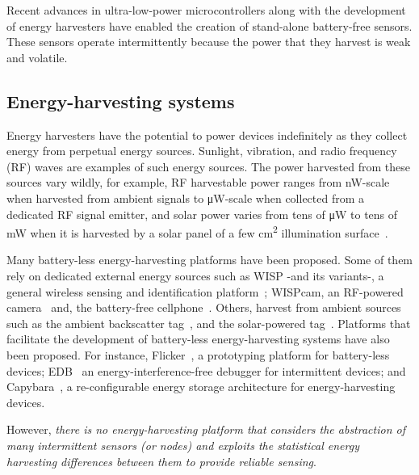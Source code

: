 Recent advances in ultra-low-power microcontrollers along with the development of energy harvesters have enabled the creation of stand-alone battery-free sensors. These sensors operate intermittently because the power that they harvest is
weak and volatile.

\subsection{Energy-harvesting systems}
Energy harvesters have the potential to power devices indefinitely as they collect energy from perpetual energy sources. Sunlight, vibration, and radio frequency (RF) waves are examples of such energy sources. The power harvested from these sources vary wildly, for example, RF harvestable power ranges from
\si{\nano\watt}-scale when harvested from ambient signals to \si{\uW}-scale when collected from a dedicated RF signal emitter, and solar power varies from tens of \si{\uW} to tens of \si{\mW} when it is harvested by a solar panel of a few \si{\cm^2} illumination surface~\cite{lucia2017intermittent,rao2017ambient}.

Many battery-less energy-harvesting platforms have been proposed. Some of them
rely on dedicated external energy sources such as WISP -and its variants-, a
general wireless sensing and identification
platform~\cite{smith2006wirelessly,zhao2015nfc,zhang2011moo}; WISPcam,  an
RF-powered camera~\cite{naderiparizi2015wispcam} and, the battery-free
cellphone~\cite{talla2017battery}. Others, harvest from ambient sources such as
the ambient backscatter tag~\cite{liu2013ambient}, and the solar-powered
tag~\cite{majid2019multi}. Platforms that facilitate the development of
battery-less energy-harvesting systems have also been proposed. For instance,
Flicker~\cite{hester2017flicker}, a prototyping platform for battery-less devices; EDB~\cite{colin2016energy} an energy-interference-free debugger for intermittent devices;  and Capybara~\cite{colin2018reconfigurable}, a re-configurable energy storage architecture for energy-harvesting devices.

However, \emph{there is no energy-harvesting platform that considers the abstraction of many intermittent sensors (or nodes) and exploits the statistical energy harvesting differences between them to provide reliable sensing}.

